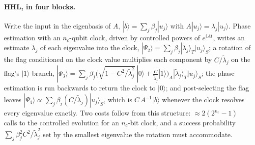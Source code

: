 \documentclass[11pt,a4paper]{article}
\begin{document}
\paragraph{HHL, in four blocks.} Write the input in the eigenbasis of $A$,
$|b\rangle=\sum_j\beta_j|u_j\rangle$ with $A|u_j\rangle=\lambda_j|u_j\rangle$.
Phase estimation with an $n_c$-qubit clock, driven by controlled powers of
$e^{iAt}$, writes an estimate $\tilde\lambda_j$ of each eigenvalue into the
clock, $|\Psi_2\rangle=\sum_j\beta_j|\tilde\lambda_j\rangle_T|u_j\rangle_S$;
a rotation of the flag conditioned on the clock value multiplies each
component by $C/\tilde\lambda_j$ on the flag's $|1\rangle$ branch,
$|\Psi_3\rangle=\sum_j\beta_j\big(\sqrt{1-C^2/\tilde\lambda_j^{2}}\,|0\rangle
+\tfrac{C}{\tilde\lambda_j}|1\rangle\big)_A|\tilde\lambda_j\rangle_T|u_j\rangle_S$;
the phase estimation is run backwards to return the clock to $|0\rangle$; and
post-selecting the flag leaves $|\Psi_4\rangle\propto\sum_j\beta_j
(C/\tilde\lambda_j)|u_j\rangle_S$, which is $C\,A^{-1}|b\rangle$ whenever the
clock resolves every eigenvalue exactly. Two costs follow from this
structure: $\approx2(2^{n_c}-1)$ calls to the controlled evolution for an
$n_c$-bit clock, and a success probability $\sum_j\beta_j^{2}C^{2}/
\tilde\lambda_j^{2}$ set by the smallest eigenvalue the rotation must
accommodate.
\end{document}
